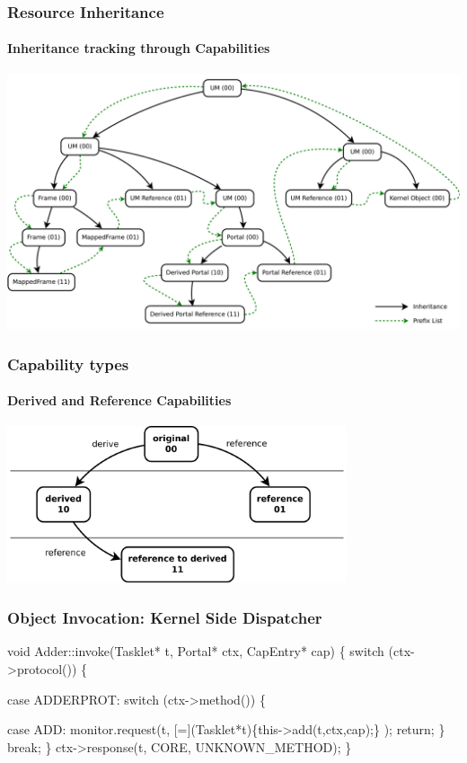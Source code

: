 \documentclass[9pt]{beamer}
\begin{document}
\begin{frame}
  \frametitle{Resource Inheritance}
  \framesubtitle{Inheritance tracking through Capabilities}
  \begin{center}
  \includegraphics[width=\textwidth]{../fig/cap-tree.pdf}
  \end{center}
\end{frame}

\begin{frame}
  \frametitle{Capability types}
  \framesubtitle{Derived and Reference Capabilities}
  \begin{center}
  \includegraphics[width=0.75\textwidth]{../fig/DerivedReferenceBits.pdf}
  \end{center}
\end{frame}

\begin{frame}[fragile]
  \frametitle{Object Invocation: Kernel Side Dispatcher}

    \begin{semiverbatim}
void Adder::invoke(Tasklet* t, Portal* ctx, CapEntry* cap) \{
  switch (ctx->protocol()) \{
  
  case ADDERPROT:
    switch (ctx->method()) \{
    
    case ADD: 
      \alert{monitor.request(t, [=](Tasklet*t)\{this->add(t,ctx,cap);\} );}
      return;
    \}
    break;
  \}
  ctx->response(t, CORE, UNKNOWN_METHOD);
\}\end{semiverbatim}

\end{frame}
\end{document}
